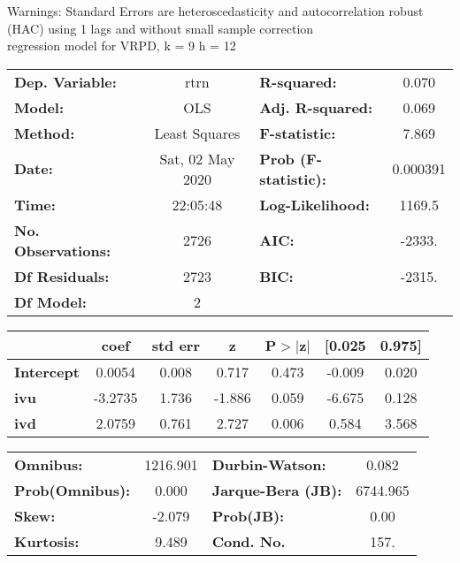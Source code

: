 Warnings: \newline
 [1] Standard Errors are heteroscedasticity and autocorrelation robust (HAC) using 1 lags and without small sample correction\\ 

regression model for VRPD, k = 9 h = 12\begin{center}
\begin{tabular}{lclc}
\toprule
\textbf{Dep. Variable:}    &       rtrn       & \textbf{  R-squared:         } &     0.070   \\
\textbf{Model:}            &       OLS        & \textbf{  Adj. R-squared:    } &     0.069   \\
\textbf{Method:}           &  Least Squares   & \textbf{  F-statistic:       } &     7.869   \\
\textbf{Date:}             & Sat, 02 May 2020 & \textbf{  Prob (F-statistic):} &  0.000391   \\
\textbf{Time:}             &     22:05:48     & \textbf{  Log-Likelihood:    } &    1169.5   \\
\textbf{No. Observations:} &        2726      & \textbf{  AIC:               } &    -2333.   \\
\textbf{Df Residuals:}     &        2723      & \textbf{  BIC:               } &    -2315.   \\
\textbf{Df Model:}         &           2      & \textbf{                     } &             \\
\bottomrule
\end{tabular}
\begin{tabular}{lcccccc}
                   & \textbf{coef} & \textbf{std err} & \textbf{z} & \textbf{P$> |$z$|$} & \textbf{[0.025} & \textbf{0.975]}  \\
\midrule
\textbf{Intercept} &       0.0054  &        0.008     &     0.717  &         0.473        &       -0.009    &        0.020     \\
\textbf{ivu}       &      -3.2735  &        1.736     &    -1.886  &         0.059        &       -6.675    &        0.128     \\
\textbf{ivd}       &       2.0759  &        0.761     &     2.727  &         0.006        &        0.584    &        3.568     \\
\bottomrule
\end{tabular}
\begin{tabular}{lclc}
\textbf{Omnibus:}       & 1216.901 & \textbf{  Durbin-Watson:     } &    0.082  \\
\textbf{Prob(Omnibus):} &   0.000  & \textbf{  Jarque-Bera (JB):  } & 6744.965  \\
\textbf{Skew:}          &  -2.079  & \textbf{  Prob(JB):          } &     0.00  \\
\textbf{Kurtosis:}      &   9.489  & \textbf{  Cond. No.          } &     157.  \\
\bottomrule
\end{tabular}
\end{center}

